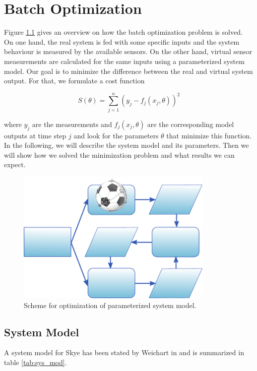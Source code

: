 \chapter{Batch Optimization}
\label{chap:batch}

Figure \ref{fig:batch_opti} gives an overview on how the batch optimization problem is solved.
On one hand, the real system is fed with some specific inputs and the system behaviour is measured by the available sensors.
On the other hand, virtual sensor measurements are calculated for the same inputs using a parameterized system model.
Our goal is to minimize the difference between the real and virtual system output.
For that, we formulate a cost function

\begin{equation}
S(\theta) = \sum_{j=1}^n ( y_j - f_j(x_j, \theta) )^2
\end{equation}

where $y_j$ are the measurements and $f_j(x_j, \theta)$ are the corresponding model outputs at time step $j$ and look for the parameters $\theta$ that minimize this function.
\\

In the following, we will describe the system model and its parameters.
Then we will show how we solved the minimization problem and what results we can expect.

\begin{figure}[btp]
\label{fig:batch_opti}
\centering
\includegraphics[width=0.85\textwidth]{images/problem_formulation.pdf}
\caption{Scheme for optimization of parameterized system model.}
\end{figure}

\section{System Model}
\label{sec:system_model}
A system model for Skye has been stated by Weichart in \cite{Weichart2012} and is summarized in table \ref{tab:sys_mod}.

